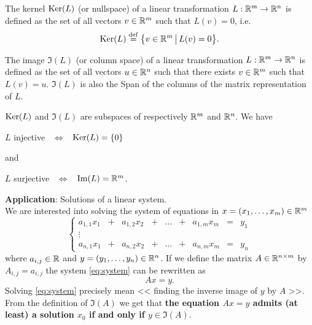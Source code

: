 \documentclass[11pt,nocut]{article}
\begin{document}
\begin{definition}[Kernel]
	The kernel ${{\rm Ker}}(L)$ (or nullspace) of a linear transformation $L: \mathbb{R}^m \to \mathbb{R}^n$ is defined as the set of all vectors $v \in \mathbb{R}^m$ such that $L(v) = 0$, i.e.
	$$
	{{\rm Ker}}(L) \overset{\rm def}{=} \big\{ v \in \mathbb{R}^m \, \big| \, L(v) = 0 \big\}.
	$$
\end{definition}

\begin{definition}[Image]
	The image $\Im(L)$ (or column space) of a linear transformation $L: \mathbb{R}^m \to \mathbb{R}^n$ is defined as the set of all vectors $u \in \mathbb{R}^n$ such that there exists $v \in \mathbb{R}^m$ such that $L(v) = u$. 
	$\Im(L)$ is also the Span of the columns of the matrix representation of $L$.
\end{definition}

\begin{proposition}\label{prop:inj_sur}
	${{\rm Ker}}(L)$ and $\Im(L)$ are subspaces of respectively $\mathbb{R}^m$ and $\mathbb{R}^n$. We have
	\begin{center}
		$L$ injective \ $\Longleftrightarrow$ \ ${{\rm Ker}}(L) = \{0 \}$
	\end{center}
	and
	\begin{center}
		$L$ surjective \ $\Longleftrightarrow$ \ ${{\rm Im}}(L) = \mathbb{R}^m$.
	\end{center}
\end{proposition}
\vspace{1cm}

\noindent
\textbf{Application}: Solutions of a linear system.
\\

We are interested into solving the system of equations in $x = (x_1, \dots, x_m) \in \mathbb{R}^m$
\begin{equation}\label{eq:system}
	\left\{
		\begin{array}{ccccccccc}
		a_{1,1} x_1 &+& a_{1,2} x_2 &+& \dots &+& a_{1,m} x_m &=& y_1 \\
		\vdots &&&&&&&& \\
		a_{n,1} x_1 &+& a_{n,2} x_2 &+& \dots &+& a_{n,m} x_m &=& y_n
	\end{array}
	\right.
\end{equation}
where $a_{i,j} \in \mathbb{R}$ and $y = (y_1, \dots, y_n) \in \mathbb{R}^n$. If we define the matrix $A \in \mathbb{R}^{n \times m}$ by $A_{i,j} = a_{i,j}$ the system \eqref{eq:system} can be rewritten as
$$
A x = y.
$$
Solving \eqref{eq:system} precisely mean << finding the inverse image of $y$ by $A$ >>. From the definition of $\Im(A)$ we get that 
\textbf{the equation $Ax = y$ admits (at least) a solution $x_0$ if and only if $y \in \Im(A)$}.
\\
\end{document}
